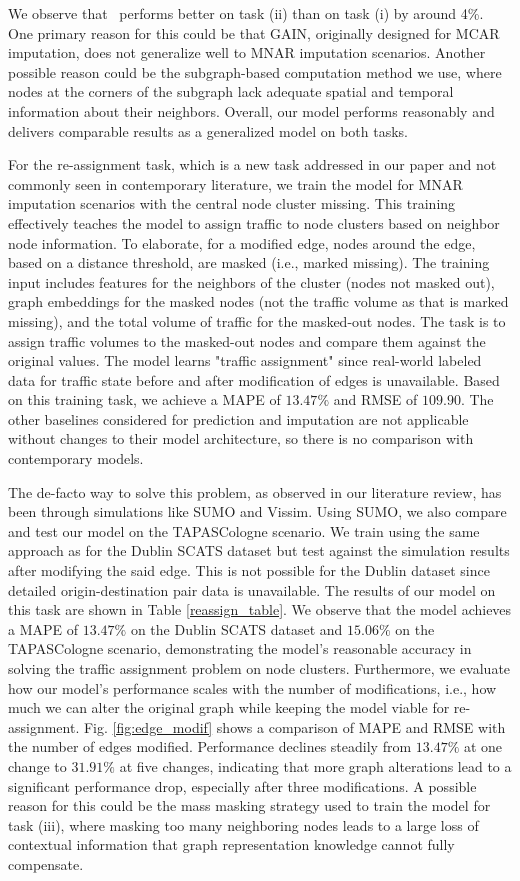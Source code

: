 We observe that \name\ performs better on task (ii) than on task (i) by around 4\%. One primary reason for this could be that GAIN, originally designed for MCAR imputation, does not generalize well to MNAR imputation scenarios. Another possible reason could be the subgraph-based computation method we use, where nodes at the corners of the subgraph lack adequate spatial and temporal information about their neighbors. Overall, our model performs reasonably and delivers comparable results as a generalized model on both tasks.

For the re-assignment task, which is a new task addressed in our paper and not commonly seen in contemporary literature, we train the model for MNAR imputation scenarios with the central node cluster missing. This training effectively teaches the model to assign traffic to node clusters based on neighbor node information. To elaborate, for a modified edge, nodes around the edge, based on a distance threshold, are masked (i.e., marked missing). The training input includes features for the neighbors of the cluster (nodes not masked out), graph embeddings for the masked nodes (not the traffic volume as that is marked missing), and the total volume of traffic for the masked-out nodes. The task is to assign traffic volumes to the masked-out nodes and compare them against the original values. The model learns "traffic assignment" since real-world labeled data for traffic state before and after modification of edges is unavailable. Based on this training task, we achieve a MAPE of $13.47\%$ and RMSE of $109.90$. The other baselines considered for prediction and imputation are not applicable without changes to their model architecture, so there is no comparison with contemporary models.

The de-facto way to solve this problem, as observed in our literature review, has been through simulations like SUMO\cite{sumo} and Vissim\cite{vissim}. Using SUMO, we also compare and test our model on the TAPASCologne scenario. We train using the same approach as for the Dublin SCATS dataset but test against the simulation results after modifying the said edge. This is not possible for the Dublin dataset since detailed origin-destination pair data is unavailable. The results of our model on this task are shown in Table \ref{reassign_table}. We observe that the model achieves a MAPE of $13.47\%$ on the Dublin SCATS dataset and $15.06\%$ on the TAPASCologne scenario, demonstrating the model's reasonable accuracy in solving the traffic assignment problem on node clusters. Furthermore, we evaluate how our model's performance scales with the number of modifications, i.e., how much we can alter the original graph while keeping the model viable for re-assignment. Fig. \ref{fig:edge_modif} shows a comparison of MAPE and RMSE with the number of edges modified. Performance declines steadily from $13.47\%$ at one change to $31.91\%$ at five changes, indicating that more graph alterations lead to a significant performance drop, especially after three modifications. A possible reason for this could be the mass masking strategy used to train the model for task (iii), where masking too many neighboring nodes leads to a large loss of contextual information that graph representation knowledge cannot fully compensate.

